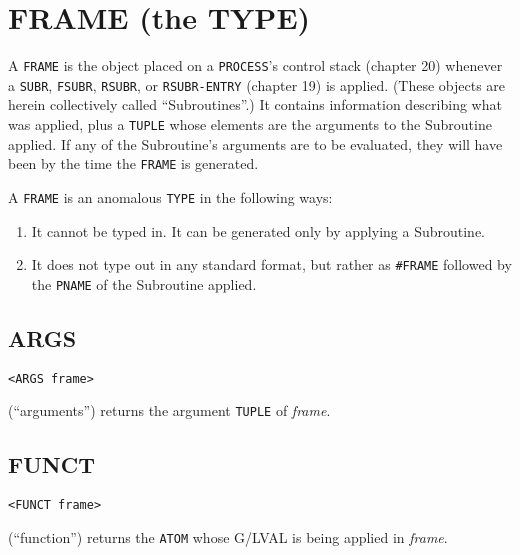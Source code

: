 \documentclass[a4paper]{scrbook}
\providecommand{\tightlist}{%
  \setlength{\itemsep}{0pt}\setlength{\parskip}{0pt}}
\begin{document}
\section{FRAME (the TYPE)}\label{frame-the-type}

A \texttt{FRAME} is the object placed on a \texttt{PROCESS}'s control stack (chapter 20)
whenever a \texttt{SUBR}, \texttt{FSUBR}, \texttt{RSUBR},
or \texttt{RSUBR-ENTRY} (chapter 19) is applied. (These objects are herein collectively called
``Subroutines''.) It contains information describing what was applied, plus a \texttt{TUPLE}
whose elements are the arguments to the Subroutine applied. If any of the Subroutine's arguments are to be evaluated, they
will have been by the time the \texttt{FRAME} is generated.

A \texttt{FRAME} is an anomalous \texttt{TYPE} in the following ways:

\begin{enumerate}
\def\labelenumi{\arabic{enumi}.}
\tightlist
\item
  It cannot be typed in. It can be generated only by applying a Subroutine.
\item
  It does not type out in any standard format, but rather as \texttt{\#FRAME} followed by the \texttt{PNAME} of the
  Subroutine applied.
\end{enumerate}

\subsection{ARGS}\label{args-1}

\begin{verbatim}
<ARGS frame>
\end{verbatim}

 (``arguments'') returns the argument \texttt{TUPLE} of \emph{frame}.

\subsection{FUNCT}\label{funct}

\begin{verbatim}
<FUNCT frame>
\end{verbatim}

 (``function'') returns the \texttt{ATOM} whose G/LVAL is being applied
in \emph{frame}.
\end{document}
